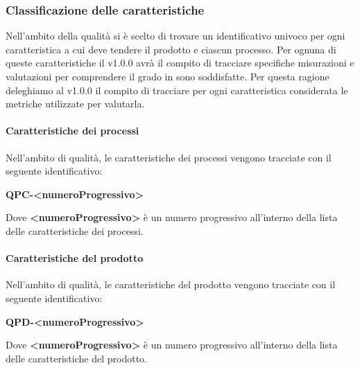         \subsubsection{Classificazione delle caratteristiche}
            Nell’ambito della qualità si è scelto di trovare un identificativo univoco per ogni caratteristica a cui deve tendere il prodotto e ciascun processo. Per ognuna di queste caratteristiche il  v1.0.0 avrà il compito di tracciare specifiche misurazioni e valutazioni per comprendere il grado in sono soddisfatte. Per questa ragione deleghiamo al  v1.0.0 il compito di tracciare per ogni caratteristica considerata le metriche utilizzate per valutarla. 
            \paragraph{Caratteristiche dei processi}
                Nell'ambito di qualità, le caratteristiche dei processi vengono tracciate con il seguente identificativo:
                \begin{center}
                    \textbf{QPC-<numeroProgressivo>}
                \end{center}
                Dove \textbf{<numeroProgressivo>} è un numero progressivo all’interno della lista delle caratteristiche dei processi.
            \paragraph{Caratteristiche del prodotto}
                Nell'ambito di qualità, le caratteristiche del prodotto vengono tracciate con il seguente identificativo:
                \begin{center}
                    \textbf{QPD-<numeroProgressivo>}
                \end{center}
                Dove \textbf{<numeroProgressivo>} è un numero progressivo all’interno della lista delle caratteristiche del prodotto.
            
